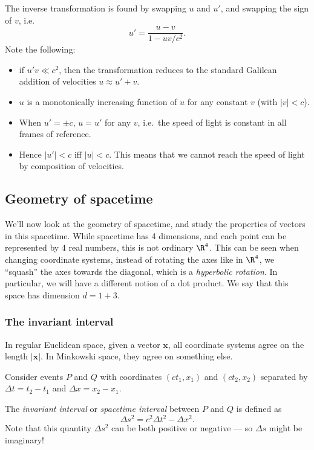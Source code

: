 \documentclass[a4paper]{article}
\begin{document}
The inverse transformation is found by swapping $u$ and $u'$, and swapping the sign of $v$, i.e.
\[
  u' = \frac{u - v}{1 - uv/c^2}.
\]
Note the following:
\begin{itemize}
  \item if $u'v \ll c^2$, then the transformation reduces to the standard Galilean addition of velocities $u \approx u' + v$.
  \item $u$ is a monotonically increasing function of $u$ for any constant $v$ (with $|v| < c$).
  \item When $u' = \pm c$, $u = u'$ for any $v$, i.e.\ the speed of light is constant in all frames of reference.
  \item Hence $|u'| < c$ iff $|u| < c$. This means that we cannot reach the speed of light by composition of velocities.
\end{itemize}

\subsection{Geometry of spacetime}
We'll now look at the geometry of spacetime, and study the properties of vectors in this spacetime. While spacetime has 4 dimensions, and each point can be represented by 4 real numbers, this is not ordinary $\R^4$. This can be seen when changing coordinate systems, instead of rotating the axes like in $\R^4$, we ``squash'' the axes towards the diagonal, which is a \emph{hyperbolic rotation}. In particular, we will have a different notion of a dot product. We say that this space has dimension $d = 1 + 3$.

\subsubsection*{The invariant interval}
In regular Euclidean space, given a vector $\mathbf{x}$, all coordinate systems agree on the length $|\mathbf{x}|$. In Minkowski space, they agree on something else.

Consider events $P$ and $Q$ with coordinates $(ct_1, x_1)$ and $(ct_2, x_2)$ separated by $\Delta t = t_2 - t_1$ and $\Delta x = x_2 - x_1$.

\begin{defi}
  The \emph{invariant interval} or \emph{spacetime interval} between $P$ and $Q$ is defined as
  \[
    \Delta s^2 = c^2 \Delta t^2 - \Delta x^2.
  \]
  Note that this quantity $\Delta s^2$ can be both positive or negative --- so $\Delta s$ might be imaginary!
\end{defi}
\end{document}
